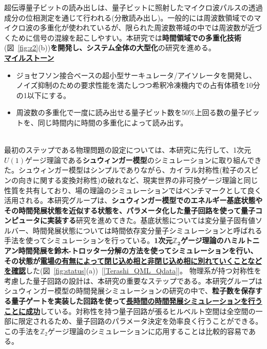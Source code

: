 \documentclass[11pt,a4j,dvipdfmx]{jarticle} 					%
\newcommand{\研究課題名}{誤り耐性量子コンピュータに向けた誤り訂正技術の開発(仮)}
\newcommand{\研究機関名}{東京大学}
\newcommand{\研究代表者氏名}{寺師弘二}
\newcommand{\研究期間の最終元号年度}{10}  %
\newcommand{\mybf}[1]{{\bfseries\sffamily#1}}
\begin{document}
超伝導量子ビットの読み出しは、量子ビットに照射したマイクロ波パルスの透過成分の位相測定を通じて行われる(分散読み出し)。一般的には周波数領域でのマイクロ波の多重化が使われているが、限られた周波数帯域の中では周波数が近づくために信号の混線を起こしやすい。本研究では\mybf{時間領域での多重化技術}(図~\ref{fig:z2}(b))\mybf{を開発し、システム全体の大型化}の研究を進める。\vspace{-4mm}\\

\underline{\bf マイルストーン}\vspace{-2mm}
\begin{itemize}
\item ジョセフソン接合ベースの超小型サーキュレータ/アイソレータを開発し、ノイズ抑制のための要求性能を満たしつつ希釈冷凍機内での占有体積を10分の1以下にする。\vspace{-2mm}
\item 周波数の多重化で一度に読み出せる量子ビット数を50\%上回る数の量子ビットを、同じ時間内に時間の多重化によって読み出す。
\end{itemize}


\\
最初のステップである物理問題の設定については、本研究に先行して、1次元$U(1)$ゲージ理論である\mybf{シュウィンガー模型}のシミュレーションに取り組んできた。シュウィンガー模型はシンプルでありながら、カイラル対称性(粒子のスピンの向きに関する変換対称性)の破れなど、現実世界の非可換ゲージ理論と同じ性質を共有しており、場の理論のシミュレーションではベンチマークとして良く活用される。本研究グループは、\mybf{シュウィンガー模型でのエネルギー基底状態やその時間発展状態を近似する状態を、パラメータ化した量子回路を使って量子コンピュータに実装する}研究を進めてきた。基底状態については変分量子固有値ソルバー、時間発展状態については時間依存変分量子シミュレーションと呼ばれる手法を使ってシミュレーションを行っている。\mybf{1次元$\pmb{\mathbb{Z}_2}$ゲージ理論のハミルトニアン時間発展を鈴木-トロッター分解の方法を使ってシミュレーションを行い、その状態が\ul{電場の有無によって閉じ込め相と非閉じ込め相に別れていくことなどを確認}}した(図~\ref{fig:status}(a))~[\ref{Terashi_QML_Qdata}]。
物理系が持つ対称性を考慮した量子回路の設計は、本研究の重要なステップである。本研究グループはシュウィンガー模型の時間発展シミュレーションの研究の中で、\mybf{粒子数を保存する量子ゲートを実装した回路を使って\ul{長時間の時間発展シミュレーションを行うことに成功}}している。対称性を持つ量子回路が張るヒルベルト空間は全空間の一部に限定されるため、量子回路のパラメータ決定を効率良く行うことができる。この手法を$\mathbb{Z}_2$ゲージ理論のシミュレーションに応用することは比較的容易である。
\end{document}
